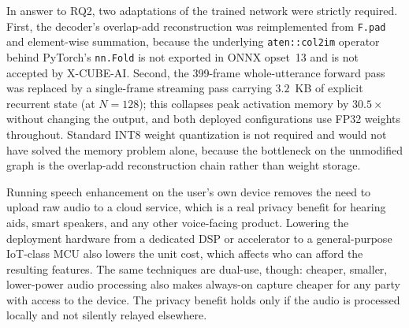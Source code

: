 \documentclass[conference]{IEEEtran}
\begin{document}
In answer to RQ2, two adaptations of the trained network were strictly required. First, the decoder's overlap-add reconstruction was reimplemented from \texttt{F.pad} and element-wise summation, because the underlying \texttt{aten::col2im} operator behind PyTorch's \texttt{nn.Fold} is not exported in ONNX opset~13 and is not accepted by X-CUBE-AI. Second, the 399-frame whole-utterance forward pass was replaced by a single-frame streaming pass carrying $3.2$~KB of explicit recurrent state (at $N{=}128$); this collapses peak activation memory by $30.5\times$ without changing the output, and both deployed configurations use FP32 weights throughout. Standard INT8 weight quantization is not required and would not have solved the memory problem alone, because the bottleneck on the unmodified graph is the overlap-add reconstruction chain rather than weight storage.

Running speech enhancement on the user's own device removes the need to upload raw audio to a cloud service, which is a real privacy benefit for hearing aids, smart speakers, and any other voice-facing product. Lowering the deployment hardware from a dedicated DSP or accelerator to a general-purpose IoT-class MCU also lowers the unit cost, which affects who can afford the resulting features. The same techniques are dual-use, though: cheaper, smaller, lower-power audio processing also makes always-on capture cheaper for any party with access to the device. The privacy benefit holds only if the audio is processed locally and not silently relayed elsewhere.
















\end{document}
